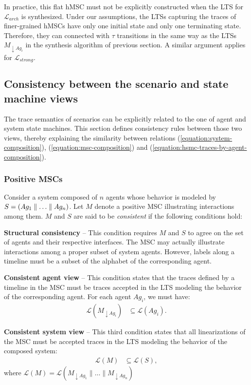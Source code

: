 In practice, this flat hMSC must not be explicitly constructed when the LTS for $\mathcal{L}_{arch}$ is synthesized. Under our assumptions, the LTSs capturing the traces of finer-grained hMSCs have only one initial state and only one terminating state. Therefore, they can connected with $\tau$ transitions in the same way as the LTSs $M_{\downarrow Ag_i}$ in the synthesis algorithm of previous section. A similar argument applies for $\mathcal{L}_{strong}$.

\subsection{Consistency between the scenario and state machine views\label{subsection:background-scenario-consistency}}

The trace semantics of scenarios can be explicitly related to the one of agent and system state machines. This section defines consistency rules between those two views, thereby explaining the similarity between relations (\ref{equation:system-composition}), (\ref{equation:msc-composition}) and (\ref{equation:hsmc-traces-by-agent-composition}).

\subsubsection*{Positive MSCs}

Consider a system composed of $n$ agents whose behavior is modeled by $S = (Ag_1 \parallel \ldots \parallel Ag_n)$. Let $M$ denote a positive MSC illustrating interactions among them. $M$ and $S$ are said to be \emph{consistent} if the following conditions hold:

\noindent \textbf{Structural consistency} -- This condition requires $M$ and $S$ to agree on the set of agents and their respective interfaces. The MSC may actually illustrate interactions among a proper subset of system agents. However, labels along a timeline must be a subset of the alphabet of the corresponding agent.

\noindent \textbf{Consistent agent view} -- This condition states that the traces defined by a timeline in the MSC must be traces accepted in the LTS modeling the behavior of the corresponding agent. For each agent $Ag_i$, we must have:
\begin{align}\mathcal{L}(M_{\downarrow Ag_i}) & \subseteq \mathcal{L}(Ag_i)\label{condition:consistent-agent-view}.\end{align}

\noindent \textbf{Consistent system view} -- This third condition states that all linearizations of the MSC must be accepted traces in the LTS modeling the behavior of the composed system:
\begin{align}\mathcal{L}(M) & \subseteq \mathcal{L}(S)\label{condition:consistent-system-view},\end{align}
where $\mathcal{L}(M) = \mathcal{L}(M_{\downarrow Ag_1} \parallel \ldots \parallel M_{\downarrow Ag_n})$

